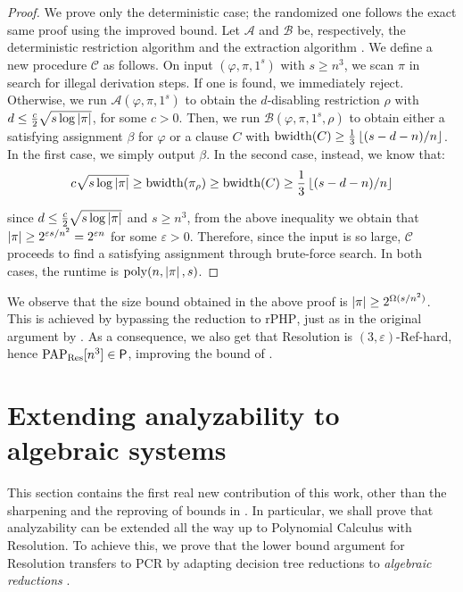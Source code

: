 \begin{proof}
    We prove only the deterministic case; the randomized one follows the exact same proof using the improved bound. Let $\mathcal{A}$ and $\mathcal{B}$ be, respectively, the deterministic restriction algorithm  and the extraction algorithm . We define a new procedure $\mathcal{C}$ as follows. On input $(\varphi, \pi, 1^s)$ with $s \geq n^3$, we scan $\pi$ in search for illegal derivation steps. If one is found, we immediately reject. Otherwise, we run $\mathcal{A}(\varphi, \pi, 1^s)$ to obtain the $d$-disabling restriction $\rho$ with $d \leq \frac{c}{2} \sqrt{s \log \left|\pi\right|}$, for some $c > 0$. Then, we run $\mathcal{B}(\varphi, \pi, 1^s, \rho)$ to obtain either a satisfying assignment $\beta$ for $\varphi$ or a clause $C$ with $\mathrm{bwidth}(C) \geq \frac{1}{3}\left \lfloor (s-d-n)/n \right \rfloor$. In the first case, we simply output $\beta$. In the second case, instead, we know that:
    \begin{equation}
        c \sqrt{s \log \left|\pi\right|} \geq \mathrm{bwidth}(\pi_{\rho}) \geq \mathrm{bwidth}(C) \geq \frac{1}{3}\left \lfloor (s-d-n)/n \right \rfloor
    \end{equation}

    since $d \leq \frac{c}{2} \sqrt{s \log \left|\pi\right|}$ and $s \geq n^3$, from the above inequality we obtain that $\left|\pi\right| \geq 2^{\varepsilon s/n^2} = 2^{\varepsilon n}$ for some $\varepsilon > 0$. Therefore, since the input is so large, $\mathcal{C}$ proceeds to find a satisfying assignment through brute-force search. In both cases, the runtime is $\mathrm{poly}(n,\left|\pi\right|,s)$.
\end{proof}

We observe that the size bound obtained in the above proof is $\left|\pi\right| \geq 2^{\Omega(s/n^2)}$. This is achieved by bypassing the reduction to $\mathrm{rPHP}$, just as in the original argument by \textcite{res_nphard}. As a consequence, we also get that Resolution is $(3,\varepsilon)$-Ref-hard, hence $\mathrm{PAP}_{\mathrm{Res}}[n^3] \in \mathsf{P}$, improving the bound of .

\section{Extending analyzability to algebraic systems}
\label{sec:analyzability_pcr}

This section contains the first real new contribution of this work, other than the sharpening and the reproving of bounds in . In particular, we shall prove that analyzability can be extended all the way up to Polynomial Calculus with Resolution. To achieve this, we prove that the lower bound argument for Resolution transfers to PCR by adapting decision tree reductions to \textit{algebraic reductions} \cite{alg_nphard}.

